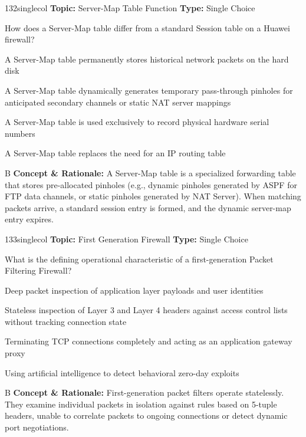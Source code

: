 \begin{qcard}{132}{singlecol}
\textcolor{darkslate!75}{\small\textbf{Topic:} Server-Map Table Function \hfill \textbf{Type:} Single Choice}\vspace{0.4em}\par
How does a Server-Map table differ from a standard Session table on a Huawei firewall?
\begin{qoptions}
\item A Server-Map table permanently stores historical network packets on the hard disk
\item A Server-Map table dynamically generates temporary pass-through pinholes for anticipated secondary channels or static NAT server mappings
\item A Server-Map table is used exclusively to record physical hardware serial numbers
\item A Server-Map table replaces the need for an IP routing table
\end{qoptions}
\end{qcard}
\nopagebreak
\begin{explainbox}{B}
\textbf{Concept \& Rationale:} A Server-Map table is a specialized forwarding table that stores pre-allocated pinholes (e.g., dynamic pinholes generated by ASPF for FTP data channels, or static pinholes generated by NAT Server). When matching packets arrive, a standard session entry is formed, and the dynamic server-map entry expires.
\end{explainbox}

\begin{qcard}{133}{singlecol}
\textcolor{darkslate!75}{\small\textbf{Topic:} First Generation Firewall \hfill \textbf{Type:} Single Choice}\vspace{0.4em}\par
What is the defining operational characteristic of a first-generation Packet Filtering Firewall?
\begin{qoptions}
\item Deep packet inspection of application layer payloads and user identities
\item Stateless inspection of Layer 3 and Layer 4 headers against access control lists without tracking connection state
\item Terminating TCP connections completely and acting as an application gateway proxy
\item Using artificial intelligence to detect behavioral zero-day exploits
\end{qoptions}
\end{qcard}
\nopagebreak
\begin{explainbox}{B}
\textbf{Concept \& Rationale:} First-generation packet filters operate statelessly. They examine individual packets in isolation against rules based on 5-tuple headers, unable to correlate packets to ongoing connections or detect dynamic port negotiations.
\end{explainbox}

